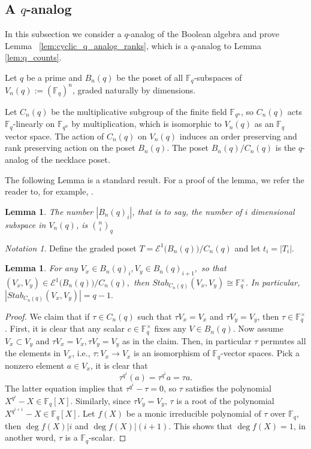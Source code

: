 \documentclass[10 pt]{amsart}
\theoremstyle{plain}
\newtheorem{lem}[thm]{Lemma}
\theoremstyle{definition}
\theoremstyle{remark}
\newtheorem{note}[thm]{Notation}
\numberwithin{equation}{section}
\newcommand\ssec{\subsection}
\newcommand\BF{{\mathbb F}}
\begin{document}
\ssec{A $q$-analog}
\label{ssec:q_analog}

In this subsection we consider a $q$-analog of the Boolean algebra and prove Lemma ~\ref{lem:cyclic_q_analog_ranks}, which is a $q$-analog to Lemma \ref{lem:q_counts}.

Let $q$ be a prime and $B_n(q)$ be the poset of all $\BF_q$-subspaces of $V_n(q) := (\BF_q)^n$,  graded naturally by dimensions. 

Let $C_n(q)$ be the multiplicative subgroup of the finite field $\BF_{q^n}$, so $C_n(q)$ acts $\BF_q$-linearly on $\BF_{q^n}$ by multiplication, which is isomorphic to $V_n(q)$ as an $\BF_q$ vector space. The action of $C_n(q)$ on $V_n(q)$ induces an order preserving and rank preserving action on the poset $B_n(q)$. The poset $B_n(q)/C_n(q)$ is the $q$-analog of the necklace poset. 

The following Lemma is a standard result. For a proof of the lemma, we refer the reader to, for example, \cite{enumerative_comb}.

\begin{lem}
\label{q:number_subspaces}
The number $|B_n(q)_i|$, that is to say, the number of $i$ dimensional subspace in $V_n(q)$, is ${n \choose i}_q$
\end{lem}

\begin{note}
Define the graded poset $T = \mathcal E^1 \big(B_n(q)\big)/C_n(q)$ and let $t_i = |T_i|.$
\end{note}

\begin{lem}
\label{lem:q_stabilizer}
For any $V_x \in B_n(q)_i,V_y \in B_n(q)_{i+1},$ so that $(V_x, V_y) \in \mathcal E^1 \big(B_n(q)\big)/C_n(q),$ then $Stab_{C_n(q)}(V_x , V_y) \cong \BF_q^\times.$ In particular, $|Stab_{C_n(q)}(V_x , V_y)|=q-1.$ 
\end{lem}
\begin{proof}
We claim that if $\tau \in C_n(q)$ such that $\tau V_x = V_x$ and $\tau V_y = V_y$, then $\tau \in \BF_q^\times$. First, it is clear that any scalar $c \in \BF_q^\times$  fixes any $V \in B_n(q)$. Now assume $V_x \subset V_y$ and $\tau V_x = V_x, \tau V_y = V_y$ as in the claim. Then, in particular $\tau$ permutes all the elements in $V_x$, i.e., $\tau: V_x \rightarrow V_x$ is an isomorphism of $\BF_q$-vector spaces. Pick a nonzero element $a \in V_x$,  it is clear that $$\tau^{q^i} (a) = \tau^{q^i} a = \tau a.$$ The latter equation implies that $\tau^{q^i} - \tau = 0$, so $\tau$ satisfies the polynomial $X^{q^{i}} - X \in \BF_q[X]$. Similarly, since $\tau V_y = V_y$, $\tau$ is a root of the polynomial $X^{q^{i+1}} - X \in\BF_q[X].$  Let $f(X)$ be a monic irreducible polynomial of $\tau$ over $\BF_q$, then $\deg f(X) | i $ and $\deg f(X) | (i+1)$. This shows that $\deg f(X) = 1$, in another word, $\tau$ is a $\BF_q$-scalar. 
\end{proof}
\end{document}
